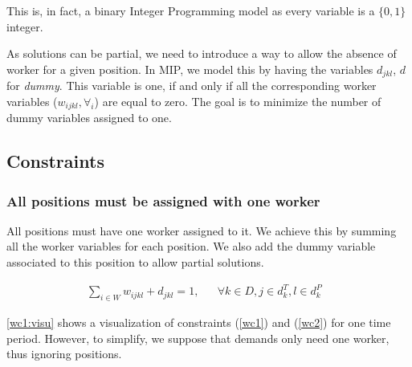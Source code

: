 \documentclass[../../thesis.tex]{subfiles}
\begin{document}
This is, in fact, a binary Integer Programming model as every variable is a $\{0, 1\}$ integer.

As solutions can be partial, we need to introduce a way to allow the absence of worker for a 
given position. In MIP, we model this by having the variables $d_{jkl}$, $d$ for \emph{dummy}. This variable is one, if and only if all the 
corresponding worker variables ($w_{ijkl}, \forall_i$) are equal to zero. The goal is to minimize 
the number of dummy variables assigned to one.

\subsection{Constraints}

\subsubsection{All positions must be assigned with one worker}

  All positions must have one worker assigned to it. We achieve this by summing all the worker variables 
  for each position. We also add the dummy variable associated to this position to allow partial 
  solutions.

  \begin{align}
    \sum_{i \in W} w_{ijkl} + d_{jkl} = 1, && \forall k \in D, j \in d_k^T, l \in d_k^P & \label{wc1}
  \end{align}


\autoref{wc1:visu} shows a visualization of constraints (\ref{wc1}) and (\ref{wc2}) for one time period.
However, to simplify, we suppose that demands only need one worker, thus ignoring positions.
\end{document}
